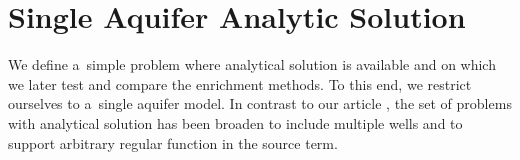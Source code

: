 
\section{Single Aquifer Analytic Solution} \label{sec:prim_analytic_solution}
We define a~simple problem where analytical solution is available and 
on which we later test and compare the enrichment methods.
To this end, we restrict ourselves to a~single aquifer model.
In contrast to our article \cite{exner_2016}, the set of problems with analytical solution 
has been broaden to include multiple wells and to support arbitrary regular function in the source term.

